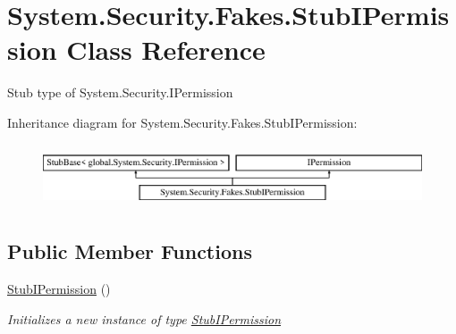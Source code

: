 \hypertarget{class_system_1_1_security_1_1_fakes_1_1_stub_i_permission}{\section{System.\-Security.\-Fakes.\-Stub\-I\-Permission Class Reference}
\label{class_system_1_1_security_1_1_fakes_1_1_stub_i_permission}
}


Stub type of System.\-Security.\-I\-Permission 


Inheritance diagram for System.\-Security.\-Fakes.\-Stub\-I\-Permission\-:\begin{figure}[H]
\begin{center}
\leavevmode
\includegraphics[height=1.904762cm]{class_system_1_1_security_1_1_fakes_1_1_stub_i_permission}
\end{center}
\end{figure}
\subsection*{Public Member Functions}
\begin{DoxyCompactItemize}
\item 
\hyperlink{class_system_1_1_security_1_1_fakes_1_1_stub_i_permission_a320ea44fba8a9750eae254129d7c8b75}{Stub\-I\-Permission} ()
\begin{DoxyCompactList}\small\item\em Initializes a new instance of type \hyperlink{class_system_1_1_security_1_1_fakes_1_1_stub_i_permission}{Stub\-I\-Permission}\end{DoxyCompactList}\end{DoxyCompactItemize}
